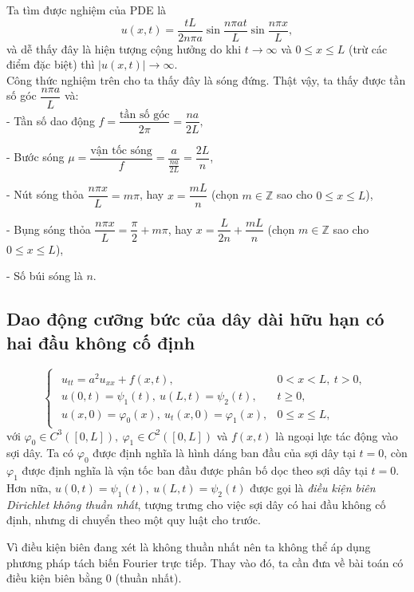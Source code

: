 \documentclass[10pt, a4paper]{article}
\begin{document}
	Ta tìm được nghiệm của PDE là $$u(x,t)=\frac{tL}{2n\pi a}\sin\dfrac{n\pi at}{L}\sin\dfrac{n\pi x}{L},$$
	và dễ thấy đây là hiện tượng cộng hưởng do khi $t\to\infty$ và $0\le x\le L$ (trừ các điểm đặc biệt) thì $|u(x,t)|\to\infty$.\\
	
	Công thức nghiệm trên cho ta thấy đây là sóng đứng. Thật vậy, ta thấy được tần số góc $\dfrac{n\pi a}{L}$ và:\\
	
	\quad- Tần số dao động $f=\dfrac{\text{tần số góc}}{2\pi}=\dfrac{na}{2L},$\vskip9pt
	
	\quad- Bước sóng $\mu=\dfrac{\text{vận tốc sóng}}{f}=\dfrac{a}{\frac{na}{2L}}=\dfrac{2L}{n}$,\vskip9pt
	
	\quad- Nút sóng thỏa $\dfrac{n\pi x}{L}=m\pi$, hay $x=\dfrac{mL}{n}$ (chọn $m\in\mathbb Z$ sao cho $0\le x\le L$),\vskip9pt
	
	\quad- Bụng sóng thỏa $\dfrac{n\pi x}{L}=\dfrac\pi2+m\pi$, hay $x=\dfrac{L}{2n}+\dfrac{mL}{n}$ (chọn $m\in\mathbb Z$ sao cho $0\le x\le L$),\vskip7pt
	
	\quad- Số búi sóng là $n$.
	\subsection{Dao động cưỡng bức của dây dài hữu hạn có hai đầu không cố định}
	\vspace{2mm}
	\begin{tcolorbox}[enhanced,colback=blue!5!white,colframe=blue!75!black,sharp corners=all,shadow={0mm}{0mm}{-1.5mm}%
		{fill=blue!75!red,opacity=0.3},title=\textbf{Dạng của bài toán}]
		$$\begin{cases}
			\begin{array}{ll}
				u_{tt}=a^2u_{xx}+f(x,t), & 0<x<L,~t>0,\\
				u(0,t)=\psi_1(t),~u(L,t)=\psi_2(t), & t\ge0,\\
				u(x,0)=\varphi_0(x),~u_t(x,0)=\varphi_1(x), & 0\le x\le L,
			\end{array}
		\end{cases}$$
		với $\varphi_0\in C^3([0,L]),~\varphi_1\in C^2([0,L])$ và $f(x,t)$ là ngoại lực tác động vào sợi dây.\vskip7pt
		\quad Ta có $\varphi_0$ được định nghĩa là hình dáng ban đầu của sợi dây tại $t=0$, còn $\varphi_1$ được định nghĩa là vận tốc ban đầu được phân bố dọc theo sợi dây tại $t=0$.\vskip7pt
		\quad Hơn nữa, $u(0,t)=\psi_1(t),~u(L,t)=\psi_2(t)$ được gọi là \textit{điều kiện biên Dirichlet không thuần nhất}, tượng trưng cho việc sợi dây có hai đầu không cố định, nhưng di chuyển theo một quy luật cho trước.
	\end{tcolorbox}
	\vspace{2mm}
	Vì điều kiện biên đang xét là không thuần nhất nên ta không thể áp dụng phương pháp tách biến Fourier trực tiếp. Thay vào đó, ta cần đưa về bài toán có điều kiện biên bằng 0 (thuần nhất).\\
	
\end{document}
